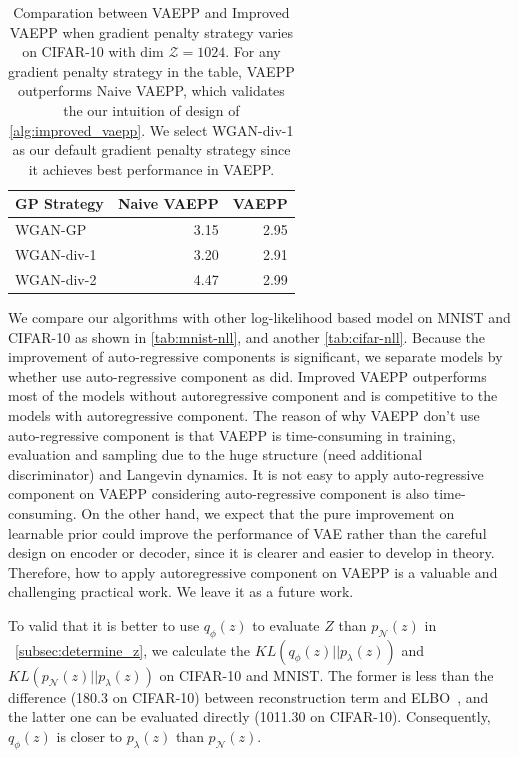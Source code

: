 \begin{table}[tb]
\centering
\begin{tabular}{lrr}  
\toprule
GP Strategy  &  Naive VAEPP  & VAEPP \\
\midrule
WGAN-GP      &  3.15   & 2.95      \\
WGAN-div-1   &  3.20   & 2.91      \\
WGAN-div-2   &  4.47   & 2.99      \\
\bottomrule
\end{tabular}
\caption{Comparation between VAEPP and Improved VAEPP when gradient penalty strategy varies on CIFAR-10 with dim $\mathcal{Z} = 1024$. For any gradient penalty strategy in the table, VAEPP outperforms Naive VAEPP, which validates the our intuition of design of \cref{alg:improved_vaepp}. We select WGAN-div-1 as our default gradient penalty strategy since it achieves best performance in VAEPP. 
}
\label{tab:compare_nD_over_R}
\end{table}

We compare our algorithms with other log-likelihood based model on MNIST and CIFAR-10 as shown in \cref{tab:mnist-nll}, and another	\cref{tab:cifar-nll}. Because the improvement of auto-regressive components is significant, we separate models by whether use auto-regressive component as \cite{maaloe2019biva} did. Improved VAEPP outperforms most of the models without autoregressive component and is competitive to the models with autoregressive component. The reason of why VAEPP don't use auto-regressive component is that VAEPP is time-consuming in training,  evaluation and sampling due to the huge structure (need additional discriminator) and Langevin dynamics. It is not easy to apply auto-regressive component on VAEPP considering auto-regressive component is also time-consuming. 
On the other hand, we expect that the pure improvement on learnable prior could improve the performance of VAE rather than the careful design on encoder or decoder, since it is clearer and easier to develop in theory. Therefore, how to apply autoregressive component on VAEPP is a valuable and challenging practical work. We leave it as a future work.

To valid that it is better to use $q_\phi(z)$ to evaluate $Z$ than $p_\mathcal{N}(z)$ in ~\cref{subsec:determine_z}, we calculate the $KL(q_\phi(z)||p_\lambda(z))$ and $KL(p_\mathcal{N}(z)||p_\lambda(z))$ on CIFAR-10 and MNIST. The former is less than the difference (180.3 on CIFAR-10) between reconstruction term and ELBO~\cite{hoffman2016elbo}, and the latter one can be evaluated directly (1011.30 on CIFAR-10). Consequently, $q_\phi(z)$ is closer to $p_\lambda(z)$ than $p_\mathcal{N}(z)$. 

